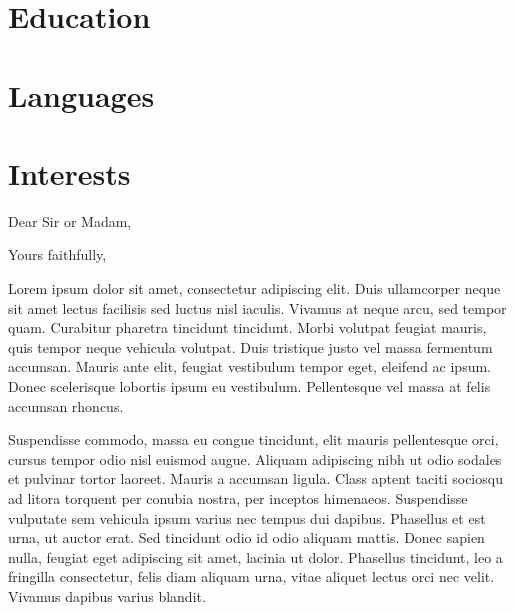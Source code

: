 \documentclass[11pt,a4paper,sans]{moderncv}        %
\begin{document}
        \section{Education}

        \section{Languages}
        
        \section{Interests}
        
        \nocite{*}
        
        \clearpage
        \date{January 01, 1984}
        \opening{Dear Sir or Madam,}
        \closing{Yours faithfully,}
        \makelettertitle
        
        Lorem ipsum dolor sit amet, consectetur adipiscing elit. Duis ullamcorper neque sit amet lectus facilisis sed luctus nisl iaculis. Vivamus at neque arcu, sed tempor quam. Curabitur pharetra tincidunt tincidunt. Morbi volutpat feugiat mauris, quis tempor neque vehicula volutpat. Duis tristique justo vel massa fermentum accumsan. Mauris ante elit, feugiat vestibulum tempor eget, eleifend ac ipsum. Donec scelerisque lobortis ipsum eu vestibulum. Pellentesque vel massa at felis accumsan rhoncus.
        
        Suspendisse commodo, massa eu congue tincidunt, elit mauris pellentesque orci, cursus tempor odio nisl euismod augue. Aliquam adipiscing nibh ut odio sodales et pulvinar tortor laoreet. Mauris a accumsan ligula. Class aptent taciti sociosqu ad litora torquent per conubia nostra, per inceptos himenaeos. Suspendisse vulputate sem vehicula ipsum varius nec tempus dui dapibus. Phasellus et est urna, ut auctor erat. Sed tincidunt odio id odio aliquam mattis. Donec sapien nulla, feugiat eget adipiscing sit amet, lacinia ut dolor. Phasellus tincidunt, leo a fringilla consectetur, felis diam aliquam urna, vitae aliquet lectus orci nec velit. Vivamus dapibus varius blandit.
        
\end{document}
